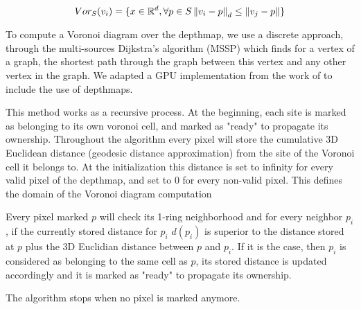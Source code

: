 \documentclass[11pt,fleqn]{book} %
\begin{document}
\begin{equation}
\label{eq:voronoi_cell}
	Vor_S(v_i) = \{ x \in \mathbb{R}^d, \forall p \in S \left\lVert v_i-p\right\rVert_d \leq \left\lVert v_j-p\right\rVert\}
\end{equation}

To compute a Voronoi diagram over the depthmap, we use a discrete approach, through the multi-sources Dijkstra's algorithm (MSSP) \cite{Dij59} which finds for a vertex of a graph, the shortest path through the graph between this vertex and any other vertex in the graph.
We adapted a GPU implementation from the work of \cite{PPA16} to include the use of depthmaps.

This method works as a recursive process. 
At the beginning, each site is marked as belonging to its own voronoi cell, and marked as "ready" to propagate its ownership.
Throughout the algorithm every pixel will store the cumulative 3D Euclidean distance (geodesic distance approximation) from the site of the Voronoi cell it belongs to. 
At the initialization this distance is set to infinity for every valid pixel of the depthmap, and set to 0 for every non-valid pixel.
This defines the domain of the Voronoi diagram computation

Every pixel marked $p$ will check its 1-ring neighborhood and for every neighbor $p_i$, if the currently stored distance for $p_i$ $d(p_i)$ is superior to the distance stored at $p$ plus the 3D Euclidian distance between $p$ and $p_i$. 
If it is the case, then $p_i$ is considered as belonging to the same cell as $p$, its stored distance is updated accordingly and it is marked as "ready" to propagate its ownership.

The algorithm stops when no pixel is marked anymore.
\end{document}
